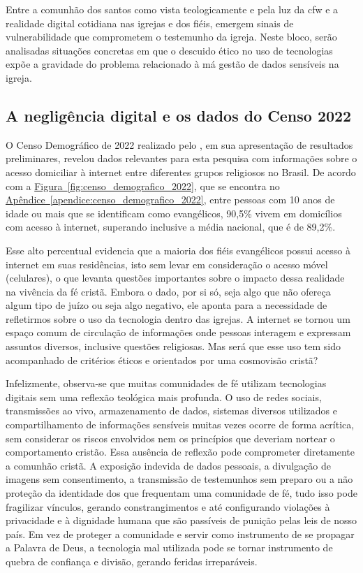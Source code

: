 Entre a comunhão dos santos como vista teologicamente e pela luz da \gls{cfw} e a realidade digital cotidiana nas igrejas e dos fiéis, emergem sinais de vulnerabilidade que comprometem o testemunho da igreja. Neste bloco, serão analisadas situações concretas em que o descuido ético no uso de tecnologias expõe a gravidade do problema relacionado à má gestão de dados sensíveis na igreja.

\subsection{A negligência digital e os dados do Censo 2022}

O Censo Demográfico de 2022 realizado pelo , em sua apresentação de resultados preliminares, revelou dados relevantes para esta pesquisa com informações sobre o acesso domiciliar à internet entre diferentes grupos religiosos no Brasil. De acordo com a \hyperref[fig:censo_demografico_2022]{Figura~\ref{fig:censo_demografico_2022}}, que se encontra no \hyperref[apendice:censo_demografico_2022]{Apêndice~\ref*{apendice:censo_demografico_2022}}, entre pessoas com 10 anos de idade ou mais que se identificam como evangélicos, 90,5\% vivem em domicílios com acesso à internet, superando inclusive a média nacional, que é de 89,2\%.

Esse alto percentual evidencia que a maioria dos fiéis evangélicos possui acesso à internet em suas residências, isto sem levar em consideração o acesso móvel (celulares), o que levanta questões importantes sobre o impacto dessa realidade na vivência da fé cristã. Embora o dado, por si só, seja algo que não ofereça algum tipo de juízo ou seja algo negativo, ele aponta para a necessidade de refletirmos sobre o uso da tecnologia dentro das igrejas. A internet se tornou um espaço comum de circulação de informações onde pessoas interagem e expressam assuntos diversos, inclusive questões religiosas. Mas será que esse uso tem sido acompanhado de critérios éticos e orientados por uma cosmovisão cristã?

Infelizmente, observa-se que muitas comunidades de fé utilizam tecnologias digitais sem uma reflexão teológica mais profunda. O uso de redes sociais, transmissões ao vivo, armazenamento de dados, sistemas diversos utilizados e compartilhamento de informações sensíveis muitas vezes ocorre de forma acrítica, sem considerar os riscos envolvidos nem os princípios que deveriam nortear o comportamento cristão. Essa ausência de reflexão pode comprometer diretamente a comunhão cristã. A exposição indevida de dados pessoais, a divulgação de imagens sem consentimento, a transmissão de testemunhos sem preparo ou a não proteção da identidade dos que frequentam uma comunidade de fé, tudo isso pode fragilizar vínculos, gerando constrangimentos e até configurando violações à privacidade e à dignidade humana que são passíveis de punição pelas leis de nosso país. Em vez de proteger a comunidade e servir como instrumento de se propagar a Palavra de Deus, a tecnologia mal utilizada pode se tornar instrumento de quebra de confiança e divisão, gerando feridas irreparáveis.

